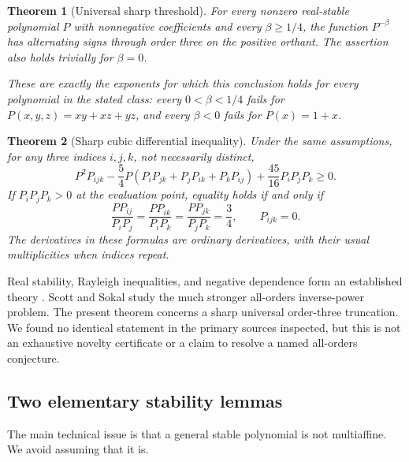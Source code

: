 \documentclass[11pt,a4paper]{article}
\newtheorem{theorem}{Theorem}[section]
\theoremstyle{definition}\newtheorem{definition}[theorem]{Definition}
\theoremstyle{remark}\newtheorem{remark}[theorem]{Remark}
\numberwithin{equation}{section}
\begin{document}
\begin{theorem}[Universal sharp threshold]\label{S05-thm:universal}
For every nonzero real-stable polynomial $P$ with nonnegative coefficients and every $\beta\ge1/4$, the function $P^{-\beta}$ has alternating signs through order three on the positive orthant. The assertion also holds trivially for $\beta=0$.

These are exactly the exponents for which this conclusion holds for \emph{every} polynomial in the stated class: every $0<\beta<1/4$ fails for $P(x,y,z)=xy+xz+yz$, and every $\beta<0$ fails for $P(x)=1+x$.
\end{theorem}

\begin{theorem}[Sharp cubic differential inequality]\label{S05-thm:cubic}
Under the same assumptions, for any three indices $i,j,k$, not necessarily distinct,
\begin{equation}\label{S05-eq:cubic}
 P^2P_{ijk}-\frac54P(P_iP_{jk}+P_jP_{ik}+P_kP_{ij})
 +\frac{45}{16}P_iP_jP_k\ge0.
\end{equation}
If $P_iP_jP_k>0$ at the evaluation point, equality holds if and only if
\begin{equation}\label{S05-eq:equality}
 \frac{PP_{ij}}{P_iP_j}=\frac{PP_{ik}}{P_iP_k}=\frac{PP_{jk}}{P_jP_k}=\frac34,
 \qquad P_{ijk}=0.
\end{equation}
The derivatives in these formulas are ordinary derivatives, with their usual multiplicities when indices repeat.
\end{theorem}

Real stability, Rayleigh inequalities, and negative dependence form an established theory \cite{ref006,ref007}. Scott and Sokal \cite{ref005} study the much stronger all-orders inverse-power problem. The present theorem concerns a sharp universal order-three truncation. We found no identical statement in the primary sources inspected, but this is not an exhaustive novelty certificate or a claim to resolve a named all-orders conjecture.

\subsection{Two elementary stability lemmas}\label{S05-sec-2}
The main technical issue is that a general stable polynomial is not multiaffine. We avoid assuming that it is.
\end{document}
